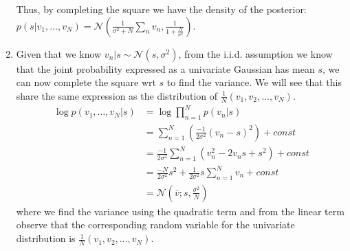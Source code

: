 \begin{enumerate}[label=\alph*.]
Thus, by completing the square we have the density of the posterior: $p(s|v_1,\dots,v_N) = \mathcal{N}(\frac{1}{\sigma^2 + N}\sum_{n}v_n, \frac{1}{1 + \frac{N}{\sigma^2}})$.

\item Given that we know $v_n|s \sim \mathcal{N}(s, \sigma^2)$, from the i.i.d. assumption we know that the joint probability expressed as a univariate Gaussian has mean $s$, we can now complete the square wrt $s$ to find the variance. We will see that this share the same expression as the distribution of $\frac{1}{N}(v_1, v_2, \dots, v_N)$.
\begin{align*}
\log p(v_1, \dots, v_N|s) &= \log \prod_{n=1}^N p(v_n|s) \\
&= \sum_{n=1}^N \left(\frac{-1}{2\sigma^2}(v_n - s)^2\right) + const\\
&= \frac{-1}{2\sigma^2}\sum_{n=1}^N \left(v_n^2 - 2v_n s + s^2\right) + const\\
&= \frac{-N}{2\sigma^2}s^2 + \frac{1}{2\sigma^2}s \sum_{n=1}^Nv_n + const\\
&= \mathcal{N}(\bar{v}; s, \frac{\sigma^2}{N})
\end{align*}
where we find the variance using the quadratic term and from the linear term observe that the corresponding random variable for the univariate distribution is $\frac{1}{N}(v_1, v_2, \dots, v_N)$.


\end{enumerate}
